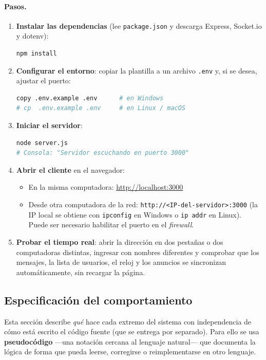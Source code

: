 \documentclass[12pt,a4paper]{article}
\begin{document}
\paragraph{Pasos.}
\begin{enumerate}[leftmargin=1.6em]
    \item \textbf{Instalar las dependencias} (lee \texttt{package.json} y descarga Express, Socket.io y dotenv):
\begin{lstlisting}[language=bash]
npm install
\end{lstlisting}
    \item \textbf{Configurar el entorno}: copiar la plantilla a un archivo \texttt{.env} y, si se desea, ajustar el puerto:
\begin{lstlisting}[language=bash]
copy .env.example .env      # en Windows
# cp  .env.example .env     # en Linux / macOS
\end{lstlisting}
    \item \textbf{Iniciar el servidor}:
\begin{lstlisting}[language=bash]
node server.js
# Consola: "Servidor escuchando en puerto 3000"
\end{lstlisting}
    \item \textbf{Abrir el cliente} en el navegador:
    \begin{itemize}[leftmargin=1.4em]
        \item En la misma computadora: \url{http://localhost:3000}
        \item Desde otra computadora de la red: \texttt{http://<IP-del-servidor>:3000} (la IP local se obtiene con \texttt{ipconfig} en Windows o \texttt{ip addr} en Linux). Puede ser necesario habilitar el puerto en el \textit{firewall}.
    \end{itemize}
    \item \textbf{Probar el tiempo real}: abrir la dirección en dos pestañas o dos computadoras distintas, ingresar con nombres diferentes y comprobar que los mensajes, la lista de usuarios, el reloj y los anuncios se sincronizan automáticamente, sin recargar la página.
\end{enumerate}

\subsection{Especificación del comportamiento}
\label{sec:especificacion}

Esta sección describe \emph{qué} hace cada extremo del sistema con independencia de cómo está escrito el código fuente (que se entrega por separado). Para ello se usa \textbf{pseudocódigo} —una notación cercana al lenguaje natural— que documenta la lógica de forma que pueda leerse, corregirse o reimplementarse en otro lenguaje.
\end{document}
